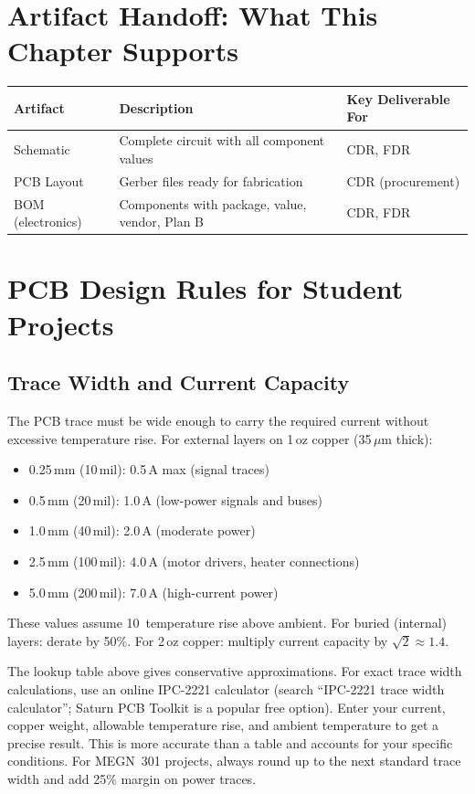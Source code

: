 \section{Artifact Handoff: What This Chapter Supports}
\begin{table}[htbp]\centering\small
\begin{tabularx}{\textwidth}{l X l}
\toprule
\textbf{Artifact} & \textbf{Description} & \textbf{Key Deliverable For} \\
\midrule
Schematic & Complete circuit with all component values & CDR, FDR \\
PCB Layout & Gerber files ready for fabrication & CDR (procurement) \\
BOM (electronics) & Components with package, value, vendor, Plan B & CDR, FDR \\
\bottomrule
\end{tabularx}
\end{table}

\section{PCB Design Rules for Student Projects}
\subsection{Trace Width and Current Capacity}
The PCB trace must be wide enough to carry the required current without excessive temperature rise. For external layers on 1\,oz copper (35\,$\mu$m thick):

\begin{itemize}[nosep,leftmargin=1.5em]
\item 0.25\,mm (10\,mil): 0.5\,A max (signal traces)
\item 0.5\,mm (20\,mil): 1.0\,A (low-power signals and buses)
\item 1.0\,mm (40\,mil): 2.0\,A (moderate power)
\item 2.5\,mm (100\,mil): 4.0\,A (motor drivers, heater connections)
\item 5.0\,mm (200\,mil): 7.0\,A (high-current power)
\end{itemize}

These values assume 10\,\degC{} temperature rise above ambient. For buried (internal) layers: derate by 50\%. For 2\,oz copper: multiply current capacity by $\sqrt{2} \approx 1.4$.

\begin{tipbox}
The lookup table above gives conservative approximations. For exact trace width calculations, use an online IPC-2221 calculator (search ``IPC-2221 trace width calculator''; Saturn PCB Toolkit is a popular free option). Enter your current, copper weight, allowable temperature rise, and ambient temperature to get a precise result. This is more accurate than a table and accounts for your specific conditions. For MEGN~301 projects, always round up to the next standard trace width and add 25\% margin on power traces.
\end{tipbox}

